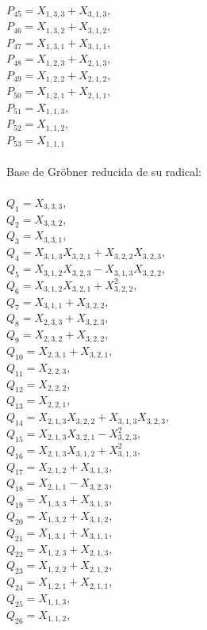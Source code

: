 \documentclass[10pt]{beamer}
\begin{document}
$P_{45}=X_{1,3,3}+X_{3,1,3},$\\
$P_{46}=X_{1,3,2}+X_{3,1,2},$\\
$P_{47}=X_{1,3,1}+X_{3,1,1},$\\
$P_{48}=X_{1,2,3}+X_{2,1,3},$\\
$P_{49}=X_{1,2,2}+X_{2,1,2},$\\
$P_{50}=X_{1,2,1}+X_{2,1,1},$\\
$P_{51}=X_{1,1,3},$\\
$P_{52}=X_{1,1,2},$\\
$P_{53}=X_{1,1,1}$\\
\\
Base de Gr\"obner reducida de su radical:\\
\\
$Q_{1}=X_{3,3,3},$\\
$Q_{2}=X_{3,3,2},$\\
$Q_{3}=X_{3,3,1},$\\
$Q_{4}=X_{3,1,3}X_{3,2,1}+X_{3,2,2}X_{3,2,3},$\\
$Q_{5}=X_{3,1,2}X_{3,2,3}-X_{3,1,3}X_{3,2,2},$\\
$Q_{6}=X_{3,1,2}X_{3,2,1}+X_{3,2,2}^2,$\\
$Q_{7}=X_{3,1,1}+X_{3,2,2},$\\
$Q_{8}=X_{2,3,3}+X_{3,2,3},$\\
$Q_{9}=X_{2,3,2}+X_{3,2,2},$\\
$Q_{10}=X_{2,3,1}+X_{3,2,1},$\\
$Q_{11}=X_{2,2,3},$\\
$Q_{12}=X_{2,2,2},$\\
$Q_{13}=X_{2,2,1},$\\
$Q_{14}=X_{2,1,3}X_{3,2,2}+X_{3,1,3}X_{3,2,3},$\\
$Q_{15}=X_{2,1,3}X_{3,2,1}-X_{3,2,3}^2,$\\
$Q_{16}=X_{2,1,3}X_{3,1,2}+X_{3,1,3}^2,$\\
$Q_{17}=X_{2,1,2}+X_{3,1,3},$\\
$Q_{18}=X_{2,1,1}-X_{3,2,3},$\\
$Q_{19}=X_{1,3,3}+X_{3,1,3},$\\
$Q_{20}=X_{1,3,2}+X_{3,1,2},$\\
$Q_{21}=X_{1,3,1}+X_{3,1,1},$\\
$Q_{22}=X_{1,2,3}+X_{2,1,3},$\\
$Q_{23}=X_{1,2,2}+X_{2,1,2},$\\
$Q_{24}=X_{1,2,1}+X_{2,1,1},$\\
$Q_{25}=X_{1,1,3},$\\
$Q_{26}=X_{1,1,2},$\\
\end{document}
